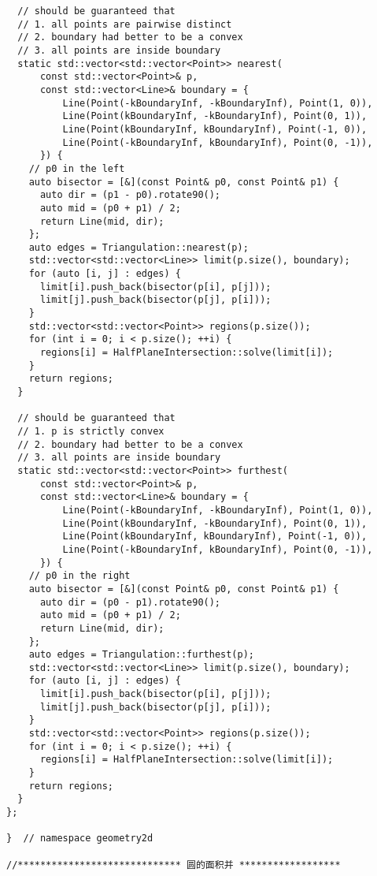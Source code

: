 \documentclass[6pt]{article}
\begin{document}
\begin{multicols}{2}
\begin{lstlisting}
  // should be guaranteed that
  // 1. all points are pairwise distinct
  // 2. boundary had better to be a convex
  // 3. all points are inside boundary
  static std::vector<std::vector<Point>> nearest(
      const std::vector<Point>& p,
      const std::vector<Line>& boundary = {
          Line(Point(-kBoundaryInf, -kBoundaryInf), Point(1, 0)),
          Line(Point(kBoundaryInf, -kBoundaryInf), Point(0, 1)),
          Line(Point(kBoundaryInf, kBoundaryInf), Point(-1, 0)),
          Line(Point(-kBoundaryInf, kBoundaryInf), Point(0, -1)),
      }) {
    // p0 in the left
    auto bisector = [&](const Point& p0, const Point& p1) {
      auto dir = (p1 - p0).rotate90();
      auto mid = (p0 + p1) / 2;
      return Line(mid, dir);
    };
    auto edges = Triangulation::nearest(p);
    std::vector<std::vector<Line>> limit(p.size(), boundary);
    for (auto [i, j] : edges) {
      limit[i].push_back(bisector(p[i], p[j]));
      limit[j].push_back(bisector(p[j], p[i]));
    }
    std::vector<std::vector<Point>> regions(p.size());
    for (int i = 0; i < p.size(); ++i) {
      regions[i] = HalfPlaneIntersection::solve(limit[i]);
    }
    return regions;
  }

  // should be guaranteed that
  // 1. p is strictly convex
  // 2. boundary had better to be a convex
  // 3. all points are inside boundary
  static std::vector<std::vector<Point>> furthest(
      const std::vector<Point>& p,
      const std::vector<Line>& boundary = {
          Line(Point(-kBoundaryInf, -kBoundaryInf), Point(1, 0)),
          Line(Point(kBoundaryInf, -kBoundaryInf), Point(0, 1)),
          Line(Point(kBoundaryInf, kBoundaryInf), Point(-1, 0)),
          Line(Point(-kBoundaryInf, kBoundaryInf), Point(0, -1)),
      }) {
    // p0 in the right
    auto bisector = [&](const Point& p0, const Point& p1) {
      auto dir = (p0 - p1).rotate90();
      auto mid = (p0 + p1) / 2;
      return Line(mid, dir);
    };
    auto edges = Triangulation::furthest(p);
    std::vector<std::vector<Line>> limit(p.size(), boundary);
    for (auto [i, j] : edges) {
      limit[i].push_back(bisector(p[i], p[j]));
      limit[j].push_back(bisector(p[j], p[i]));
    }
    std::vector<std::vector<Point>> regions(p.size());
    for (int i = 0; i < p.size(); ++i) {
      regions[i] = HalfPlaneIntersection::solve(limit[i]);
    }
    return regions;
  }
};

}  // namespace geometry2d

//***************************** 圆的面积并 ******************


\end{lstlisting}
\end{multicols}
\end{document}
